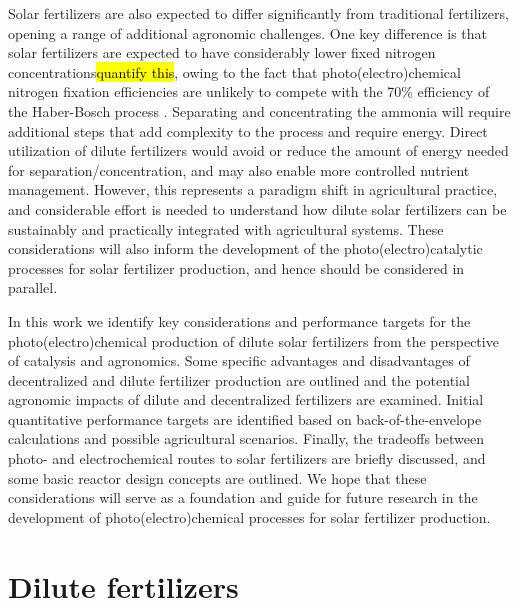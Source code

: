 Solar fertilizers are also expected to differ significantly from traditional fertilizers, opening a range of additional agronomic challenges. One key difference is that solar fertilizers are expected to have considerably lower fixed nitrogen concentrations\hl{quantify this}, owing to the fact that photo(electro)chemical nitrogen fixation efficiencies are unlikely to compete with the 70\% efficiency of the Haber-Bosch process \cite{Schloegl_2003}. %
Separating and concentrating the ammonia will require additional steps that add complexity to the process and require energy. Direct utilization of dilute fertilizers would avoid or reduce the amount of energy needed for separation/concentration, and may also enable more controlled nutrient management. However, this represents a paradigm shift in agricultural practice, and considerable effort is needed to understand how dilute solar fertilizers can be sustainably and practically integrated with agricultural systems. These considerations will also inform the development of the photo(electro)catalytic processes for solar fertilizer production, and hence should be considered in parallel.

In this work we identify key considerations and performance targets for the photo(electro)chemical production of dilute solar fertilizers from the perspective of catalysis and agronomics. Some specific advantages and disadvantages of decentralized and dilute fertilizer production are outlined and the potential agronomic impacts of dilute and decentralized fertilizers are examined. Initial quantitative performance targets are identified based on back-of-the-envelope calculations and possible agricultural scenarios. Finally, the tradeoffs between photo- and electrochemical routes to solar fertilizers are briefly discussed, and some basic reactor design concepts are outlined. We hope that these considerations will serve as a foundation and guide for future research in the development of photo(electro)chemical processes for solar fertilizer production.

\section{Dilute fertilizers}

